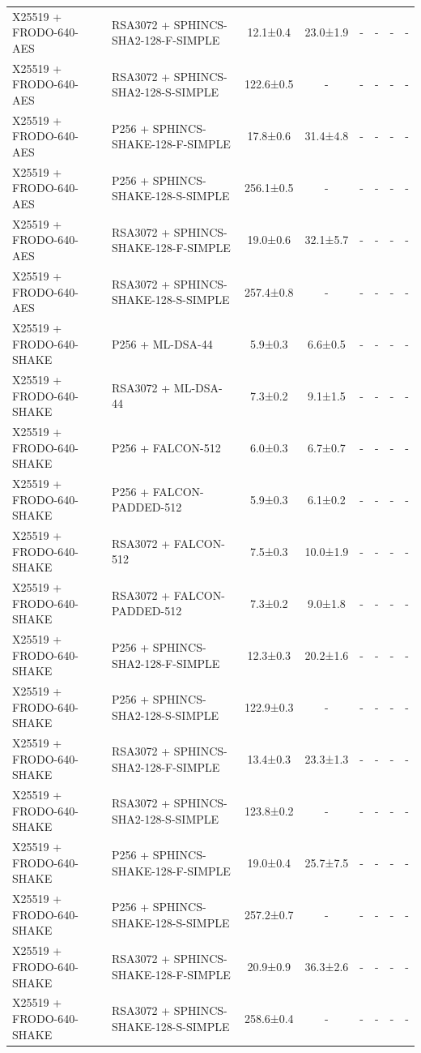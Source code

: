 \documentclass[10pt]{article}
\begin{document}
\begin{tabular}{@{}l l c c c c c c@{}}
X25519 + FRODO-640-AES & RSA3072 + SPHINCS-SHA2-128-F-SIMPLE & 12.1±0.4 & 23.0±1.9 & - & - & - & - \\
X25519 + FRODO-640-AES & RSA3072 + SPHINCS-SHA2-128-S-SIMPLE & 122.6±0.5 & - & - & - & - & - \\
X25519 + FRODO-640-AES & P256 + SPHINCS-SHAKE-128-F-SIMPLE & 17.8±0.6 & 31.4±4.8 & - & - & - & - \\
X25519 + FRODO-640-AES & P256 + SPHINCS-SHAKE-128-S-SIMPLE & 256.1±0.5 & - & - & - & - & - \\
X25519 + FRODO-640-AES & RSA3072 + SPHINCS-SHAKE-128-F-SIMPLE & 19.0±0.6 & 32.1±5.7 & - & - & - & - \\
X25519 + FRODO-640-AES & RSA3072 + SPHINCS-SHAKE-128-S-SIMPLE & 257.4±0.8 & - & - & - & - & - \\
X25519 + FRODO-640-SHAKE & P256 + ML-DSA-44 & 5.9±0.3 & 6.6±0.5 & - & - & - & - \\
X25519 + FRODO-640-SHAKE & RSA3072 + ML-DSA-44 & 7.3±0.2 & 9.1±1.5 & - & - & - & - \\
X25519 + FRODO-640-SHAKE & P256 + FALCON-512 & 6.0±0.3 & 6.7±0.7 & - & - & - & - \\
X25519 + FRODO-640-SHAKE & P256 + FALCON-PADDED-512 & 5.9±0.3 & 6.1±0.2 & - & - & - & - \\
X25519 + FRODO-640-SHAKE & RSA3072 + FALCON-512 & 7.5±0.3 & 10.0±1.9 & - & - & - & - \\
X25519 + FRODO-640-SHAKE & RSA3072 + FALCON-PADDED-512 & 7.3±0.2 & 9.0±1.8 & - & - & - & - \\
X25519 + FRODO-640-SHAKE & P256 + SPHINCS-SHA2-128-F-SIMPLE & 12.3±0.3 & 20.2±1.6 & - & - & - & - \\
X25519 + FRODO-640-SHAKE & P256 + SPHINCS-SHA2-128-S-SIMPLE & 122.9±0.3 & - & - & - & - & - \\
X25519 + FRODO-640-SHAKE & RSA3072 + SPHINCS-SHA2-128-F-SIMPLE & 13.4±0.3 & 23.3±1.3 & - & - & - & - \\
X25519 + FRODO-640-SHAKE & RSA3072 + SPHINCS-SHA2-128-S-SIMPLE & 123.8±0.2 & - & - & - & - & - \\
X25519 + FRODO-640-SHAKE & P256 + SPHINCS-SHAKE-128-F-SIMPLE & 19.0±0.4 & 25.7±7.5 & - & - & - & - \\
X25519 + FRODO-640-SHAKE & P256 + SPHINCS-SHAKE-128-S-SIMPLE & 257.2±0.7 & - & - & - & - & - \\
X25519 + FRODO-640-SHAKE & RSA3072 + SPHINCS-SHAKE-128-F-SIMPLE & 20.9±0.9 & 36.3±2.6 & - & - & - & - \\
X25519 + FRODO-640-SHAKE & RSA3072 + SPHINCS-SHAKE-128-S-SIMPLE & 258.6±0.4 & - & - & - & - & - \\

\end{tabular}
\end{document}
